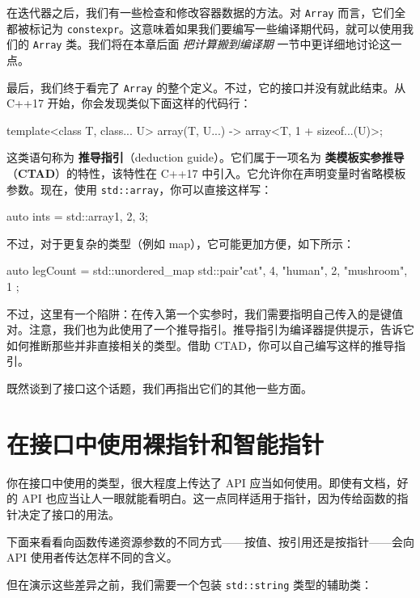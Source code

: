 在迭代器之后，我们有一些检查和修改容器数据的方法。对 \texttt{Array} 而言，它们全都被标记为 \texttt{constexpr}。这意味着如果我们要编写一些编译期代码，就可以使用我们的 \texttt{Array} 类。我们将在本章后面 \emph{把计算搬到编译期} 一节中更详细地讨论这一点。

\label{idx:451}
\label{idx:452}
最后，我们终于看完了 \texttt{Array} 的整个定义。不过，它的接口并没有就此结束。从 C++17 开始，你会发现类似下面这样的代码行：

\begin{codebox}[cpp]
template<class T, class... U>
    array(T, U...) -> array<T, 1 + sizeof...(U)>;
\end{codebox}

\label{idx:453}
\label{idx:454}
这类语句称为 \textbf{推导指引}（deduction guide）。它们属于一项名为 \textbf{类模板实参推导}（\textbf{CTAD}）的特性，该特性在 C++17 中引入。它允许你在声明变量时省略模板参数。现在，使用 \texttt{std::\allowbreak{}array}，你可以直接这样写：

\begin{codebox}[cpp]
auto ints = std::array{1, 2, 3};
\end{codebox}

不过，对于更复杂的类型（例如 map），它可能更加方便，如下所示：

\begin{codebox}[cpp]
auto legCount = std::unordered_map{ std::pair{"cat", 4}, {"human", 2}, {"mushroom", 1} };
\end{codebox}

不过，这里有一个陷阱：在传入第一个实参时，我们需要指明自己传入的是键值对。注意，我们也为此使用了一个推导指引。推导指引为编译器提供提示，告诉它如何推断那些并非直接相关的类型。借助 CTAD，你可以自己编写这样的推导指引。

既然谈到了接口这个话题，我们再指出它们的其他一些方面。

\section{在接口中使用裸指针和智能指针}

\label{idx:455}
你在接口中使用的类型，很大程度上传达了 API 应当如何使用。即使有文档，好的 API 也应当让人一眼就能看明白。这一点同样适用于指针，因为传给函数的指针决定了接口的用法。

下面来看看向函数传递资源参数的不同方式——按值、按引用还是按指针——会向 API 使用者传达怎样不同的含义。

但在演示这些差异之前，我们需要一个包装 \texttt{std::\allowbreak{}string} 类型的辅助类：

